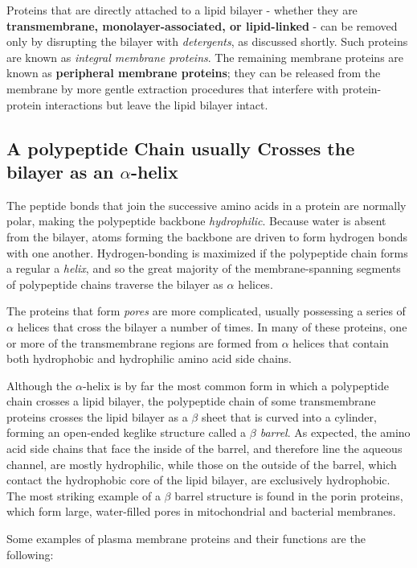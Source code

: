 Proteins that are directly attached to a lipid bilayer - whether they are
\textbf{transmembrane, monolayer-associated, or lipid-linked} - can be removed
only by disrupting the bilayer with \textit{detergents}, as discussed shortly. Such
proteins are known as \textit{integral membrane proteins}. The remaining membrane proteins 
are known as \textbf{peripheral membrane proteins}; they can
be released from the membrane by more gentle extraction procedures
that interfere with protein-protein interactions but leave the lipid bilayer
intact.

\subsection{A polypeptide Chain usually Crosses the bilayer as an $\alpha$-helix}

The peptide bonds that join the successive amino acids in a protein are normally polar, making
the polypeptide backbone \textit{hydrophilic}. Because water is
absent from the bilayer, atoms forming the backbone are driven to form
hydrogen bonds with one another. Hydrogen-bonding is maximized if the
polypeptide chain forms a regular a \textit{helix}, and so the great majority of the
membrane-spanning segments of polypeptide chains traverse the bilayer
as $\alpha$ helices.

The proteins that form \textit{pores} are more complicated, usually possessing a
series of $\alpha$ helices that cross the bilayer a number of times. In many of these proteins,
one or more of the transmembrane regions are formed from $\alpha$ helices
that contain both hydrophobic and hydrophilic amino acid side chains.

Although the $\alpha$-helix is by far the most common form in which a polypeptide
chain crosses a lipid bilayer, the polypeptide chain of some transmembrane
proteins crosses the lipid bilayer as a $\beta$ sheet that is curved into a
cylinder, forming an open-ended keglike structure called a \textit{$\beta$ barrel}. As
expected, the amino acid side chains that face the inside of the barrel, and
therefore line the aqueous channel, are mostly hydrophilic, while those
on the outside of the barrel, which contact the hydrophobic core of the
lipid bilayer, are exclusively hydrophobic. The most striking example of a
$\beta$ barrel structure is found in the porin proteins, which form large, water-filled
pores in mitochondrial and bacterial membranes.

Some examples of plasma membrane proteins and their functions are the following:

